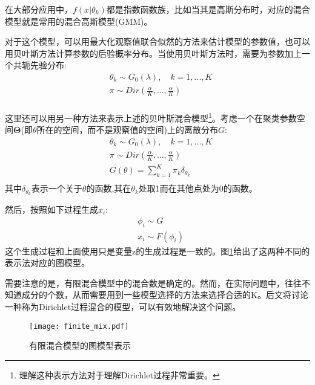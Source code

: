 在大部分应用中，$f(x|\theta_k)$都是指数函数族，比如当其是高斯分布时，对应的混合模型就是常用的混合高斯模型(GMM)。

对于这个模型，可以用最大化观察值联合似然的方法来估计模型的参数值，也可以用贝叶斯方法计算参数的后验概率分布。当使用贝叶斯方法时，需要为参数加上一个共轭先验分布:
\begin{equation}
\begin{split}
& \theta_k \sim G_0(\lambda) , \quad k = 1,...,K\\
& \pi \sim Dir(\frac{\alpha}{K},...,\frac{\alpha}{K})\\
\end{split} \label{eq:aux_finite_mix_p}
\end{equation}

这里还可以用另一种方法来表示上述的贝叶斯混合模型\footnote{理解这种表示方法对于理解Dirichlet过程非常重要。}。考虑一个在聚类参数空间${\bm \Theta}$(即$\theta$所在的空间，而不是观察值的空间)上的离散分布$G$:
\begin{equation}
\begin{split}
& \theta_k \sim G_0(\lambda), \quad k = 1,...,K\\
& \pi \sim Dir(\frac{\alpha}{K},...,\frac{\alpha}{K})\\
& G(\theta) = \sum_{k=1}^K\pi_k\delta_{\theta_k}\\
\end{split} \label{eq:finite_mix_p}
\end{equation}
其中$\delta_{\theta_k}$表示一个关于$\theta$的函数,其在$\theta_k$处取1而在其他点处为0的函数。

然后，按照如下过程生成$x_i$:
\begin{equation}
\begin{split}
& \phi_i \sim G\\
& x_i \sim F(\phi_i) \label{eq:finite_mix_g}
\end{split}
\end{equation}
这个生成过程和上面使用只是变量z的生成过程是一致的。图\ref{fig:finite_mix}给出了这两种不同的表示法对应的图模型。

需要注意的是，有限混合模型中的混合数是确定的。然而，在实际问题中，往往不知道成分的个数，从而需要用到一些模型选择的方法来选择合适的K。后文将讨论一种称为Dirichlet过程混合的模型，可以有效地解决这个问题。
\begin{figure}
\texttt{[image: finite\_mix.pdf]} 
  \caption{有限混合模型的图模型表示} \label{fig:finite_mix}
\end{figure}


